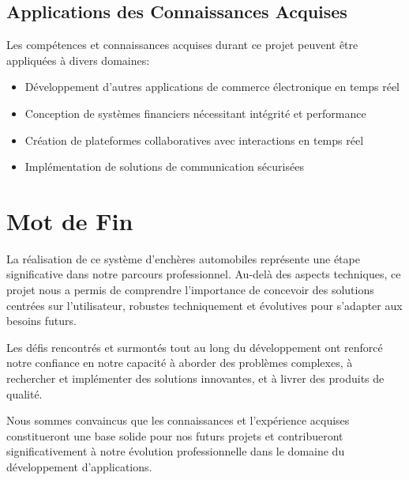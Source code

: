 \subsection{Applications des Connaissances Acquises}

Les compétences et connaissances acquises durant ce projet peuvent être appliquées à divers domaines:

\begin{itemize}
    \item Développement d'autres applications de commerce électronique en temps réel
    \item Conception de systèmes financiers nécessitant intégrité et performance
    \item Création de plateformes collaboratives avec interactions en temps réel
    \item Implémentation de solutions de communication sécurisées
\end{itemize}

\section{Mot de Fin}

La réalisation de ce système d'enchères automobiles représente une étape significative dans notre parcours professionnel. Au-delà des aspects techniques, ce projet nous a permis de comprendre l'importance de concevoir des solutions centrées sur l'utilisateur, robustes techniquement et évolutives pour s'adapter aux besoins futurs.

Les défis rencontrés et surmontés tout au long du développement ont renforcé notre confiance en notre capacité à aborder des problèmes complexes, à rechercher et implémenter des solutions innovantes, et à livrer des produits de qualité.

Nous sommes convaincus que les connaissances et l'expérience acquises constitueront une base solide pour nos futurs projets et contribueront significativement à notre évolution professionnelle dans le domaine du développement d'applications. 